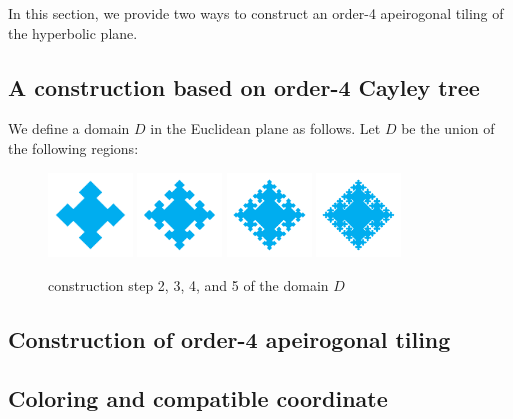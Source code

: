 In this section, we provide two ways to construct an order-4 apeirogonal tiling of the hyperbolic plane.

\subsection{A construction based on order-4 Cayley tree}\label{sec:tree}

We define a domain $D$ in the Euclidean plane as follows. Let $D$ be the union of the following regions:

\begin{figure}
    \centering
    \includegraphics[width=0.2\textwidth]{images/cayley-tree-4-border-2.pdf}
    \includegraphics[width=0.2\textwidth]{images/cayley-tree-4-border-3.pdf}
    \includegraphics[width=0.2\textwidth]{images/cayley-tree-4-border-4.pdf}
    \includegraphics[width=0.2\textwidth]{images/cayley-tree-4-border-5.pdf}
    \caption{construction step 2, 3, 4, and 5 of the domain $D$}
\end{figure}

\subsection{Construction of order-4 apeirogonal tiling}\label{sec:tiling}

\subsection{Coloring and compatible coordinate}\label{sec:coloring}
